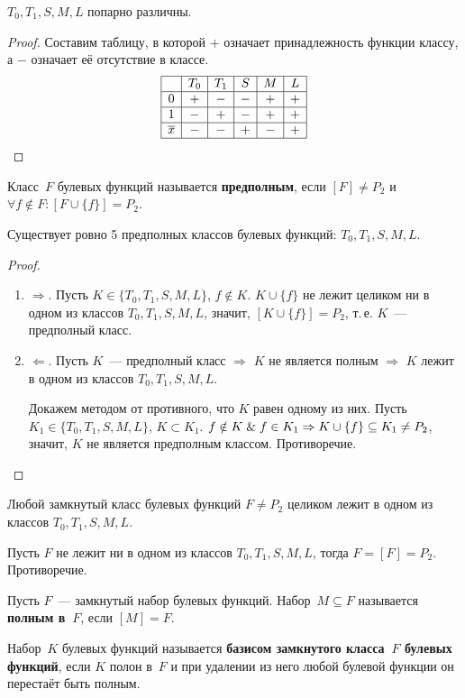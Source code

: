 \begin{statement}
$T_0, T_1, S, M, L$ попарно различны.
\end{statement}
\begin{proof}
Составим таблицу, в которой $+$ означает принадлежность функции классу, а $-$ означает её отсутствие в классе.
\begin{equation*}
\begin{array}{|c|c|c|c|c|c|}
\hline
  & T_0 & T_1 & S & M & L \\
  \hline
0 & + & - & - & + & + \\
\hline
1 & - & + & - & + & + \\
\hline
\overline x & - & - & + & - & + \\
\hline
\end{array}
\end{equation*}
\end{proof}

Класс~$F$ булевых функций называется \textbf{предполным}, если $[F] \neq P_2$ и $\forall f \notin F \colon [F \cup \{ f \}] = P_2$.

\begin{statement}
Существует ровно 5 предполных классов булевых функций: $T_0, T_1, S, M, L$.
\end{statement}
\begin{proof}
\begin{enumerate}
	\item $\Rightarrow$. Пусть $K \in \{ T_0, T_1, S, M, L \}$, $f \notin K$.
	$K \cup \{ f \}$ не лежит целиком ни в одном из классов $T_0, T_1, S, M, L$, значит, $[K \cup \{ f \}] = P_2$, т.\,е. $K$~--- предполный класс.
	\item $\Leftarrow$. Пусть $K$~--- предполный класс $\Rightarrow$ $K$ не является полным $\Rightarrow$ $K$ лежит в одном из классов $T_0, T_1, S, M, L$.
	
	Докажем методом от противного, что $K$ равен одному из них.
	Пусть $K_1 \in \{ T_0, T_1, S, M, L \}$, $K \subset K_1$.
	$f \notin K \opbr\lAnd f \in K_1 \opbr\Rightarrow K \cup \{ f \} \subseteq K_1 \neq P_2$, значит, $K$ не является предполным классом.
	Противоречие.
\end{enumerate}
\end{proof}

\begin{consequent}
Любой замкнутый класс булевых функций $F \neq P_2$ целиком лежит в одном из классов $T_0, T_1, S, M, L$.
\end{consequent}
\begin{proofcontra}
Пусть $F$ не лежит ни в одном из классов $T_0, T_1, S, M, L$, тогда $F = [F] = P_2$.
Противоречие.
\end{proofcontra}

Пусть $F$~--- замкнутый набор булевых функций. Набор~$M \subseteq F$ называется \textbf{полным в~$F$}, если $[M] = F$.

 Набор~$K$ булевых функций называется \textbf{базисом замкнутого класса~$F$ булевых функций}, если $K$ полон в~$F$ и при удалении из него любой булевой функции он перестаёт быть полным.
